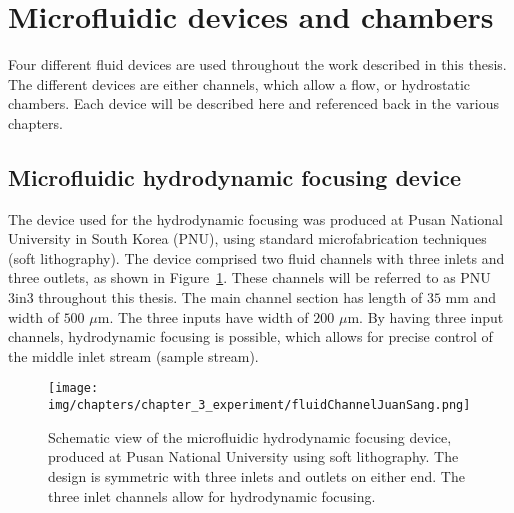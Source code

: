\section{Microfluidic devices and chambers}\label{sec:microfluidicDevicesAndChambers}
Four different fluid devices are used throughout the work described in this thesis. The different devices are either channels, which allow a flow, or hydrostatic chambers. Each device will be described here and referenced back in the various chapters.


\subsection{Microfluidic hydrodynamic focusing device}\label{subsec:microfluidicHydrodynamicFocusingChannel}
The device used for the hydrodynamic focusing was produced at Pusan National University in South Korea (PNU), using standard microfabrication techniques (soft lithography). The device comprised two fluid channels with three inlets and three outlets, as shown in Figure~\ref{fig:fluidChannelJuanSang}. These channels will be referred to as PNU 3in3 throughout this thesis. The main channel section has length of $35$ mm and width of $500$ $\mu$m. The three inputs have width of $200$ $\mu$m. By having three input channels, hydrodynamic focusing is possible, which allows for precise control of the middle inlet stream (sample stream). 

\begin{figure}[htb]
	\centering
   \texttt{[image: img/chapters/chapter\_3\_experiment/fluidChannelJuanSang.png]}
	\caption[Microfluidic hydrodynamic focusing device]{Schematic view of the microfluidic hydrodynamic focusing device, produced at Pusan National University using soft lithography. The design is symmetric with three inlets and outlets on either end. The three inlet channels allow for hydrodynamic focusing.}
\label{fig:fluidChannelJuanSang}
\end{figure}

